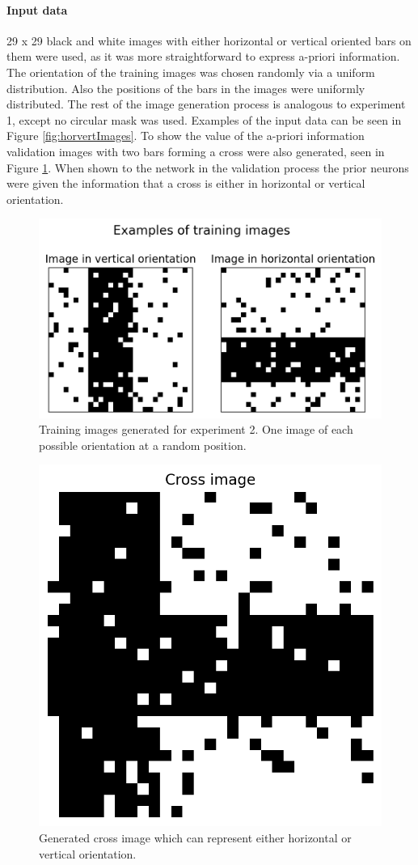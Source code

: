 \paragraph{Input data}
29 x 29 black and white images with either horizontal or vertical oriented bars on them were used, as it was more straightforward to express a-priori information. The orientation of the training images was chosen randomly via a uniform distribution. Also the positions of the bars in the images were uniformly distributed. The rest of the image generation process is analogous to experiment 1, except no circular mask was used. Examples of the input data can be seen in Figure \ref{fig:horvertImages}. To show the value of the a-priori information validation images with two bars forming a cross were also generated, seen in Figure \ref{fig:horvertTrainingCrossImage}. When shown to the network in the validation process the prior neurons were given the information that a cross is either in horizontal or vertical orientation.

\begin{figure}
  \includegraphics[width=\linewidth]{figures/horvert/horvertTrainingImages.png}
  \caption{Training images generated for experiment 2. One image of each possible orientation at a random position.}
\end{figure}

\begin{figure}
  \includegraphics[width=0.6\linewidth]{figures/horvert/horvertTrainingCrossImage.png}
  \caption{Generated cross image which can represent either horizontal or vertical orientation.}
  \label{fig:horvertTrainingCrossImage}
\end{figure}


